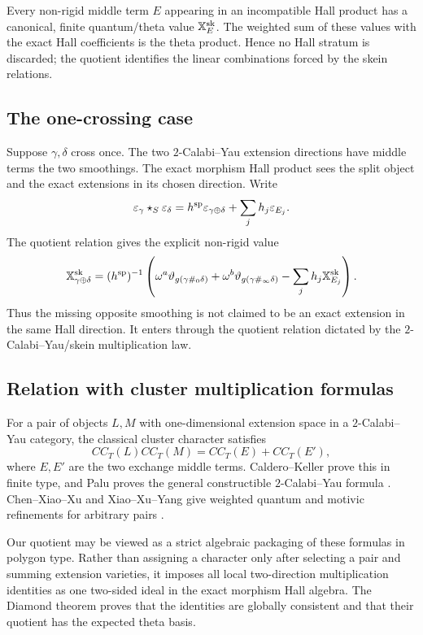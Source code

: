\begin{corollary}
\label{cor:middle-term-meaning}
Every non-rigid middle term $E$ appearing in an incompatible Hall product has
a canonical, finite quantum/theta value $\mathbb X_E^{\rm sk}$.  The weighted sum
of these values with the exact Hall coefficients is the theta product.  Hence
no Hall stratum is discarded; the quotient identifies the linear combinations
forced by the skein relations.
\end{corollary}

\subsection{The one-crossing case}

Suppose $\gamma,\delta$ cross once.  The two $2$-Calabi--Yau extension
directions have middle terms the two smoothings.  The exact morphism Hall
product sees the split object and the exact extensions in its chosen
direction.  Write
\[
 \varepsilon_\gamma\star_S\varepsilon_\delta
 =h^{\rm sp}\varepsilon_{\gamma\oplus\delta}
  +\sum_jh_j\varepsilon_{E_j}.
\]
The quotient relation gives the explicit non-rigid value
\begin{equation}
 \mathbb X_{\gamma\oplus\delta}^{\rm sk}
 =(h^{\rm sp})^{-1}\left(
   \omega^a\vartheta_{g(\gamma\#_0\delta)}
  +\omega^b\vartheta_{g(\gamma\#_\infty\delta)}
  -\sum_jh_j\mathbb X_{E_j}^{\rm sk}
 \right).
 \label{eq:one-crossing-nonrigid}
\end{equation}
Thus the missing opposite smoothing is not claimed to be an exact extension in
the same Hall direction.  It enters through the quotient relation dictated by
the $2$-Calabi--Yau/skein multiplication law.

\subsection{Relation with cluster multiplication formulas}

For a pair of objects $L,M$ with one-dimensional extension space in a
$2$-Calabi--Yau category, the classical cluster character satisfies
\[
 CC_T(L)CC_T(M)=CC_T(E)+CC_T(E'),
\]
where $E,E'$ are the two exchange middle terms.  Caldero--Keller prove this in
finite type, and Palu proves the general constructible $2$-Calabi--Yau formula
\cite{CalderoKeller,PaluMultiplication}.  Chen--Xiao--Xu and
Xiao--Xu--Yang give weighted quantum and motivic refinements for arbitrary
pairs \cite{ChenXiaoXu,XiaoXuYang}.

Our quotient may be viewed as a strict algebraic packaging of these formulas
in polygon type.  Rather than assigning a character only after selecting a
pair and summing extension varieties, it imposes all local two-direction
multiplication identities as one two-sided ideal in the exact morphism Hall
algebra.  The Diamond theorem proves that the identities are globally
consistent and that their quotient has the expected theta basis.

